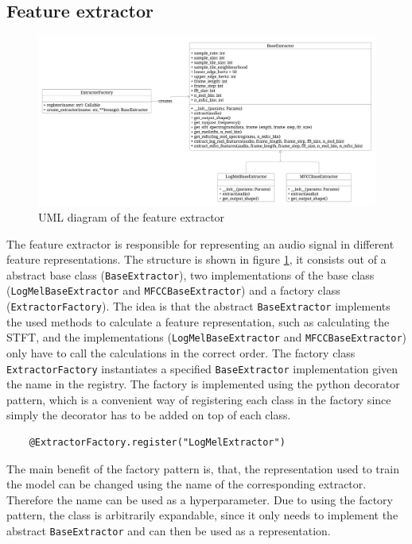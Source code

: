 \subsection{Feature extractor}
\label{sub:Component-Feature-Extractor}
\begin{figure}[htbp]
	\centering
	\includegraphics[width=\linewidth]{baa-documentation/img/UML_Feature_Extractor.jpeg}
	\caption{UML diagram of the \flqq feature extractor\frqq}
	\label{fig:UML-Feature-Extractor}
\end{figure}
\noindent
The feature extractor is responsible for representing an audio signal in different feature representations. The structure is shown in figure \ref{fig:UML-Feature-Extractor}, it consists out of a abstract base class (\texttt{BaseExtractor}), two implementations of the base class (\texttt{LogMelBaseExtractor} and \texttt{MFCCBaseExtractor}) and a factory class (\texttt{ExtractorFactory}). The idea is that the abstract \texttt{BaseExtractor} implements the used methods to calculate a feature representation, such as calculating the \gls{STFT}, and the implementations (\texttt{LogMelBaseExtractor} and \texttt{MFCCBaseExtractor}) only have to call the calculations in the correct order. The factory class \texttt{ExtractorFactory} instantiates a specified \texttt{BaseExtractor} implementation given the name in the registry. The factory is implemented using the python decorator pattern, which is a convenient way of registering each class in the factory since simply the decorator has to be added on top of each class.
\begin{verbatim}
    @ExtractorFactory.register("LogMelExtractor")
\end{verbatim}
The main benefit of the factory pattern is, that, the representation used to train the model can be changed using the name of the corresponding extractor. Therefore the name can be used as a hyperparameter. Due to using the factory pattern, the class is arbitrarily expandable, since it only needs to implement the abstract \texttt{BaseExtractor} and can then be used as a representation.

